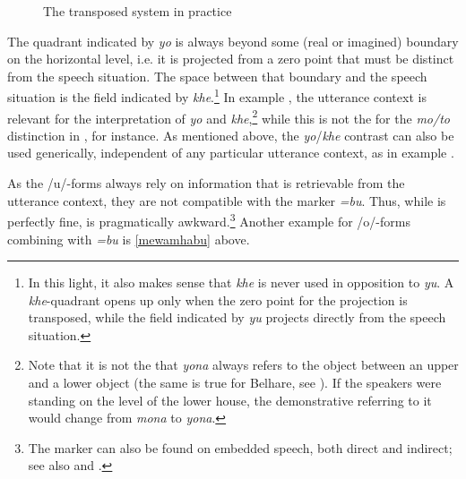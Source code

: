 \begin{figure}
\centering
\setlength{\fboxsep}{0pt}
\caption{The transposed system in practice}\label{deixill-3}
\end{figure}

The quadrant indicated by \emph{yo} is always beyond some (real or imagined) boundary on the horizontal level, i.e. it is projected from a zero point that must be distinct from the speech situation. The space between that boundary and the speech situation is the field indicated by \emph{khe}.\footnote{In this light, it also makes sense that \emph{khe} is never used in opposition to \emph{yu}. A \emph{khe}-quadrant opens up only when the zero point for the projection is transposed, while the field indicated by \emph{yu} projects directly from the speech situation.} In  example \Last[a], the  utterance context is relevant for the interpretation of \emph{yo} and \emph{khe},\footnote{Note that it is not the  that \emph{yona} always refers to the object between an upper and a lower object (the same is true for Belhare, see \citealt{Bickel2001Deictic}).  If the speakers were standing on the level of the lower house, the demonstrative referring to it would change from \emph{mona} to \emph{yona}.} while this is not the  for the \emph{mo/to} distinction in \LLast[b], for instance. As mentioned above, the \emph{yo}/\emph{khe}  contrast can also be used generically, independent  of any particular utterance context, as in example  \Last[b].
 
As the /u/-forms always rely on information that is retrievable from the utterance context, they are not compatible with the  marker \emph{=bu}. Thus, while \Next[a] is perfectly fine, \Next[b] is pragmatically awkward.\footnote{The  marker can also be found on embedded speech, both direct and indirect; see also  and .} Another example for /o/-forms combining with \emph{=bu} is \ref{mewamhabu} above.

